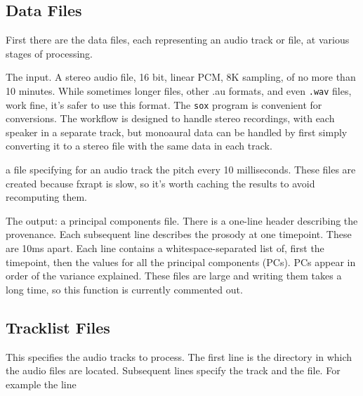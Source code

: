 \documentclass[11pt]{article}
\begin{document}
\subsection{Data Files}

First there are the data files, each representing an audio track or
file, at various stages of processing.

\begin{description}   \setlength{\itemsep}{0pt}\setlength{\parskip}{0pt}

\item [---.au] The input.  A stereo audio file, 16 bit, linear PCM, 8K
  sampling, of no more than 10 minutes.  While sometimes longer files,
  other .au formats, and even {\tt .wav} files, work fine, it's safer
  to use this format. The {\tt sox} program is convenient for
  conversions.  The workflow is designed to handle stereo recordings,
  with each speaker in a separate track, but monoaural data can be
  handled by first simply converting it to a stereo file with the same
  data in each track.

\item[---f0.mat] a file specifying for an audio track the pitch every
  10 milliseconds.  These files are created because fxrapt is slow, so
  it's worth caching the results to avoid recomputing them.

\item[---.pc] The output: a principal components file.  There is a
  one-line header describing the provenance.  Each subsequent line
  describes the prosody at one timepoint.  These are 10ms apart.  Each
  line contains a whitespace-separated list of, first the timepoint,
  then the values for all the principal components (PCs).  PCs appear
  in order of the variance explained.  These files are large and
  writing them takes a long time, so this function is currently
  commented out.
\end{description}


\subsection{Tracklist Files}       \label{tracklist-files}

This specifies the audio tracks to process.  The first line is the
directory in which the audio files are located.  Subsequent lines
specify the track and the file.  For example the line
\end{document}
